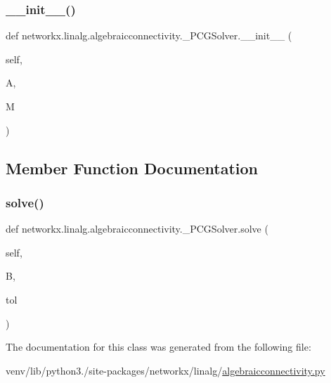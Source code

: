 \subsubsection{\texorpdfstring{\+\_\+\+\_\+init\+\_\+\+\_\+()}{\_\_init\_\_()}}
{\footnotesize\ttfamily def networkx.\+linalg.\+algebraicconnectivity.\+\_\+\+P\+C\+G\+Solver.\+\_\+\+\_\+init\+\_\+\+\_\+ (\begin{DoxyParamCaption}\item[{}]{self,  }\item[{}]{A,  }\item[{}]{M }\end{DoxyParamCaption})}



\subsection{Member Function Documentation}
\mbox{\label{classnetworkx_1_1linalg_1_1algebraicconnectivity_1_1__PCGSolver_a82deb87df9ee62a11c434cd27dac07bf}} 
\subsubsection{\texorpdfstring{solve()}{solve()}}
{\footnotesize\ttfamily def networkx.\+linalg.\+algebraicconnectivity.\+\_\+\+P\+C\+G\+Solver.\+solve (\begin{DoxyParamCaption}\item[{}]{self,  }\item[{}]{B,  }\item[{}]{tol }\end{DoxyParamCaption})}



The documentation for this class was generated from the following file\+:\begin{DoxyCompactItemize}
\item 
venv/lib/python3./site-\/packages/networkx/linalg/\hyperlink{algebraicconnectivity_8py}{algebraicconnectivity.\+py}\end{DoxyCompactItemize}
